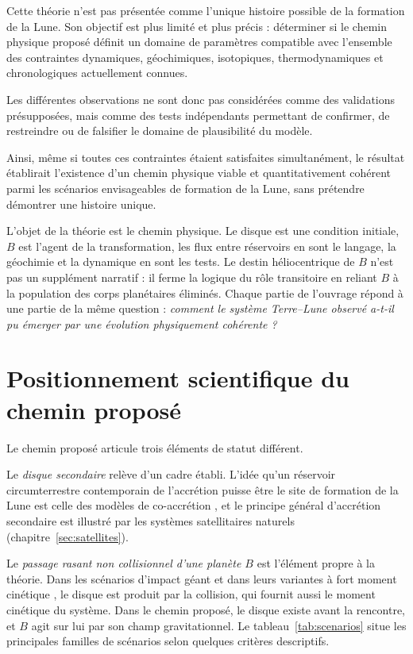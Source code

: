 \documentclass[11pt,a4paper,openany]{report}
\begin{document}
Cette théorie n'est pas présentée comme l'unique histoire possible de la formation de la Lune.
Son objectif est plus limité et plus précis : déterminer si le chemin physique proposé définit un
domaine de paramètres compatible avec l'ensemble des contraintes dynamiques, géochimiques,
isotopiques, thermodynamiques et chronologiques actuellement connues.

Les différentes observations ne sont donc pas considérées comme des validations présupposées,
mais comme des tests indépendants permettant de confirmer, de restreindre ou de falsifier le
domaine de plausibilité du modèle.

Ainsi, même si toutes ces contraintes étaient satisfaites simultanément, le résultat établirait
l'existence d'un chemin physique viable et quantitativement cohérent parmi les scénarios
envisageables de formation de la Lune, sans prétendre démontrer une histoire unique.

\begin{ideephys}
L'objet de la théorie est le chemin physique. Le disque est une condition initiale, $B$ est l'agent
de la transformation, les flux entre réservoirs en sont le langage, la géochimie et la dynamique en
sont les tests. Le destin héliocentrique de $B$ n'est pas un supplément narratif : il ferme la logique
du rôle transitoire en reliant $B$ à la population des corps planétaires éliminés. Chaque partie de
l'ouvrage répond à une partie de la même question :
\emph{comment le système Terre--Lune observé a-t-il pu émerger par une évolution
physiquement cohérente ?}
\end{ideephys}

\section{Positionnement scientifique du chemin proposé}

Le chemin proposé articule trois éléments de statut différent.

Le \emph{disque secondaire} relève d'un cadre établi. L'idée qu'un réservoir circumterrestre
contemporain de l'accrétion puisse être le site de formation de la Lune est celle des modèles de
co-accrétion \cite{Ruskol1960,Weidenschilling1986}, et le principe général d'accrétion secondaire
est illustré par les systèmes satellitaires naturels (chapitre~\ref{sec:satellites}).

Le \emph{passage rasant non collisionnel d'une planète $B$} est l'élément propre à la théorie.
Dans les scénarios d'impact géant \cite{HartmannDavis1975,CameronWard1976,CanupAsphaug2001,Canup2004}
et dans leurs variantes à fort moment cinétique \cite{CukStewart2012,Canup2012,Lock2018}, le disque
est produit par la collision, qui fournit aussi le moment cinétique du système. Dans le chemin
proposé, le disque existe avant la rencontre, et $B$ agit sur lui par son champ gravitationnel. Le
tableau~\ref{tab:scenarios} situe les principales familles de scénarios selon quelques critères
descriptifs.
\end{document}
